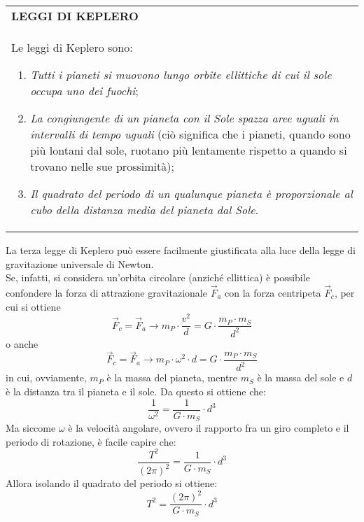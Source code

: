 \documentclass[a4paper]{extarticle}
\renewcommand\arraystretch{}
\begin{document}
\vspace{1em}
\setlength{\tabcolsep}{14pt}
\renewcommand{\arraystretch}{2}
\noindent
\begin{tabularx}{\textwidth}{@{}|P|@{}}
    \hline
    {\textbf{LEGGI DI KEPLERO}}\\
    \parbox{\linewidth}{Le leggi di Keplero sono:
    \begin{enumerate}
      \item \emph{Tutti i pianeti si muovono lungo orbite ellittiche di cui il sole occupa uno dei fuochi};
      \item \emph{La congiungente di un pianeta con il Sole spazza aree uguali in intervalli di tempo uguali} (ciò significa che i pianeti, quando sono più lontani dal sole, ruotano più lentamente rispetto a quando si trovano nelle sue prossimità);
      \item \emph{Il quadrato del periodo di un qualunque pianeta è proporzionale al cubo della distanza media del pianeta dal Sole}.
    \end{enumerate}
    \vspace{1mm}}\\
    \hline
\end{tabularx}

\vspace{2em}
\noindent
La terza legge di Keplero può essere facilmente giustificata alla luce della legge di gravitazione universale di Newton.\\
Se, infatti, si considera un'orbita circolare (anziché ellittica) è possibile confondere la forza di attrazione gravitazionale $\vec F_a$ con la forza centripeta $\vec F_c$, per cui si ottiene
\[\vec F_c = \vec F_a \longrightarrow m_P \cdot \frac{v^2}{d} = G \cdot \frac{m_P \cdot m_S}{d^2}\]
o anche
\[\vec F_c = \vec F_a \longrightarrow m_P \cdot \omega^2 \cdot d = G \cdot \frac{m_P \cdot m_S}{d^2}\]
in cui, ovviamente, $m_P$ è la massa del pianeta, mentre $m_S$ è la massa del sole e $d$ è la distanza tra il pianeta e il sole. Da questo si ottiene che:
\[\frac{1}{\omega^2} = \frac{1}{G \cdot m_S} \cdot d^3\]
Ma siccome $\omega$ è la velocità angolare, ovvero il rapporto fra un giro completo e il periodo di rotazione, è facile capire che:
\[\frac{T^2}{(2\pi)^2} = \frac{1}{G \cdot m_S} \cdot d^3\]
Allora isolando il quadrato del periodo si ottiene:
\[\boxed{T^2 = \frac{(2 \pi)^2}{G \cdot m_S} \cdot d^3}\]
\end{document}
